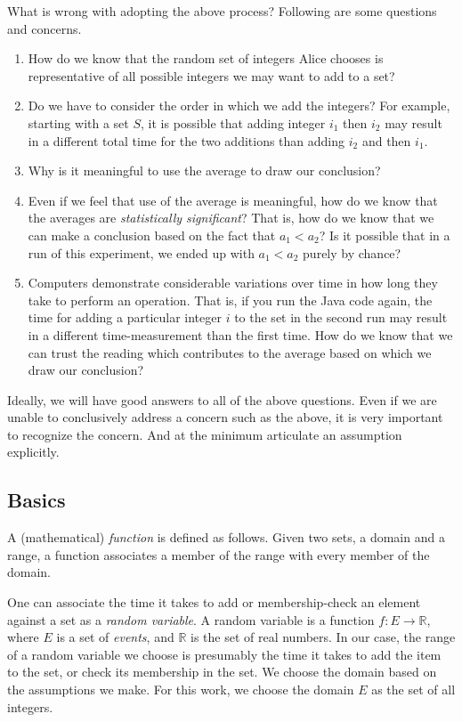 What is wrong with adopting the above process? Following are some
questions and concerns.

\begin{enumerate}
    \item How do we know that the random set of integers Alice chooses
	is representative of all possible integers we may want to
	add to a set?
    \item Do we have to consider the order in which we add
	the integers? For example, starting with a set $S$, it
	is possible that adding integer $i_1$ then $i_2$ may
	result in a different total time for the two additions
	than adding $i_2$ and then $i_1$.
    \item Why is it meaningful to use the average to draw our
	conclusion?
    \item Even if we feel that use of the average is meaningful,
	how do we know that the averages are \emph{statistically
	significant}? That is, how do we know that we can make a
	conclusion based on the fact that $a_1 < a_2$? Is it possible
	that in a run of this experiment, we ended up with
	$a_1 < a_2$ purely by chance?
    \item Computers demonstrate considerable variations over
	time in how long they take to perform an operation. That is,
	if you run the Java code again, the time for adding a 
	particular integer $i$ to the set in the second run may
	result in a different time-measurement than the first time.
	How do we know that we can trust the reading which contributes
	to the average based on which we draw our conclusion?
\end{enumerate}

Ideally, we will have good answers to all of the above questions.
Even if we are unable to conclusively address a concern such
as the above, it is very important to recognize the concern. And
at the minimum articulate an assumption explicitly.

\subsection{Basics} \label{sec:statistics:basics}
A (mathematical) \emph{function} is defined as follows. Given two sets,
a domain and a range, a function associates a member of the
range with every member of the domain.

One can associate the time it takes to add or membership-check
an element against a set as a \emph{random variable}.
A random variable is a function
$f\!\! : E \longrightarrow \mathbb{R}$, where $E$ is a set
of \emph{events}, and $\mathbb{R}$ is the set of 
real numbers. In our case, the range of a random variable
we choose is presumably the time it takes to add
the item to the set, or check its membership in the set.
We choose the domain based on the assumptions we make.
For this work, we choose the domain $E$ as the set
of all integers.

